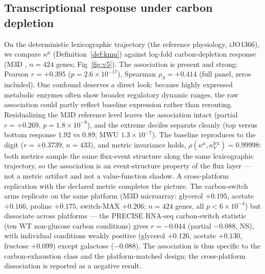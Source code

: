 \documentclass[11pt,a4paper]{article}
\theoremstyle{plain}
\theoremstyle{definition}
\theoremstyle{remark}
\newcommand{\kk}{\kappa_{\!V}}
\newcommand{\kmu}{\kappa^{\mu}}
\begin{document}
\subsection{Transcriptional response under carbon depletion}
\label{sec:v5}
On the deterministic lexicographic trajectory (the reference physiology, iJO1366),
we compare $\kmu$ (Definition~\ref{def:kmu}) against log-fold
carbon-depletion response (M3D \citep{faith2008}, $n = 424$ genes;
Fig~\ref{fig:v5}). The association is present and strong: Pearson
$r = +0.395$ ($p = 2.6 \times 10^{-17}$), Spearman
$\rho_S = +0.414$ (full panel, zeros included). One confound
deserves a direct look: because highly expressed metabolic enzymes
often show broader regulatory dynamic ranges, the raw association
could partly reflect baseline expression rather than rerouting.
Residualizing the M3D reference level leaves the association intact
(partial $r = +0.269$, $p = 1.8 \times 10^{-8}$), and the extreme
deciles separate cleanly (top versus bottom response $1.92$ vs
$0.89$; MWU $1.3 \times 10^{-7}$). The baseline reproduces to the
digit ($r = +0.3739$, $n = 433$), and metric invariance holds,
$\rho(\kmu, \kk^{\mathrm{lex}}) = 0.99998$: both metrics sample the
same flux-event structure along the same lexicographic trajectory,
so the association is an event-structure property of the flux layer ---
not a metric artifact and not a value-function shadow. A
cross-platform replication with the declared metric completes the
picture. The carbon-switch arms replicate on the same platform (M3D
microarray: glycerol $+0.195$, acetate $+0.166$, proline $+0.175$,
switch-MAX $+0.206$; $n = 424$ genes, all $p < 6 \times 10^{-4}$)
but dissociate across platforms --- the PRECISE RNA-seq
carbon-switch statistic (ten WT non-glucose carbon conditions)
gives $r = -0.044$ (partial $-0.088$, NS), with individual
conditions weakly positive (glycerol $+0.126$, acetate $+0.130$,
fructose $+0.099$) except galactose ($-0.088$). The association is
thus specific to the carbon-exhaustion class and the platform-matched
design; the cross-platform dissociation is reported as a negative
result.
\end{document}
